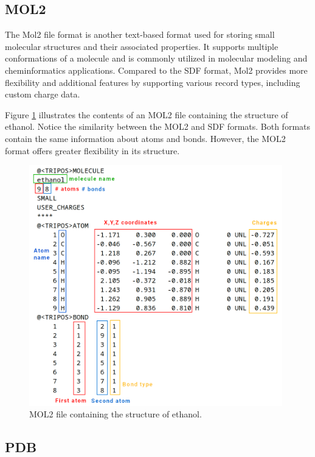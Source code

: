 \documentclass[
  digital,     %
  oneside,     %
  nosansbold,  %
  nocolorbold, %
  lof,         %
  lot,         %
]{fithesis4}
\begin{document}
\subsection{MOL2}
\label{subsection:mol2}

The Mol2 file format is another text-based format used for storing small molecular structures and their associated properties. It supports multiple conformations of a molecule and is commonly utilized in molecular modeling and cheminformatics applications. Compared to the SDF format, Mol2 provides more flexibility and additional features by supporting various record types, including custom charge data.\cite{manish}

Figure \ref{fig:mol2} illustrates the contents of an MOL2 file containing the structure of ethanol. Notice the similarity between the MOL2 and SDF formats. Both formats contain the same information about atoms and bonds. However, the MOL2 format offers greater flexibility in its structure.

\begin{figure}[htbp]
  \begin{center}
    \includegraphics[width=11cm]{figures/mol2_file_format.png}
  \end{center}
  \caption{MOL2 file containing the structure of ethanol.}
  \label{fig:mol2}
\end{figure}

\subsection{PDB}
\label{subsection:pdb}
\end{document}
